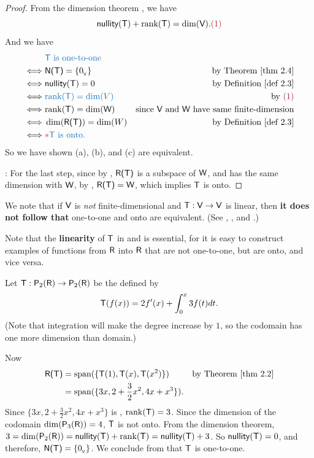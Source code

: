 \begin{proof}
From the dimension theorem , we have
\[
    \nullityT + \rankT = \dim(\V). \MAROON{(1)}
\]
And we have
\begin{align*}
         & \BLUE{\T \text{ is one-to-one }} \\
    \iff & \NULLT = \{ \OV \} & \text{by \THM{2.4}} \\
    \iff & \nullityT = 0 & \text{by \DEF{2.3}} \\
    \iff & \BLUE{\rankT = \dim(V)} & \text{by \MAROON{(1)}} \\
    \iff & \rankT = \dim(\W) & \text{since \(\V\) and \(\W\) have same finite-dimension} \\
    \iff & \dim(\RANGET) = \dim(W) & \text{by \DEF{2.3}} \\
    \iff & \RED{*} \BLUE{\T \text{ is onto.}}
\end{align*}
So we have shown (a), (b), and (c) are equivalent.

\RED{*}: For the last step, since by , \(\textsf{R(T)}\) is a subspace of \(\textsf{W}\), and has the same dimension with \(\textsf{W}\), by , \(\textsf{R(T)} = \textsf{W}\), which implies \(\textsf{T}\) is onto.
\end{proof}

\begin{remark} \label{remark 2.1.10}
We note that if \(\textsf{V}\) is \emph{not} finite-dimensional and \(\textsf{T} : \textsf{V} \to \textsf{V}\) is linear, then \textbf{it does not follow that} one-to-one and onto are equivalent.
(See , , and .)

Note that the \textbf{linearity} of \(\textsf{T}\) in  and  is essential, for it is easy to construct examples of functions from \(\textsf{R}\) into \(\textsf{R}\) that are not one-to-one, but
are onto, and vice versa.
\end{remark}

\begin{example} \label{example 2.1.11}
Let \(\textsf{T} : \textsf{P}_2(\textsf{R}) \to \textsf{P}_2(\textsf{R})\) be the \LTRAN{} defined by
\[
    \textsf{T}(f(x)) = 2f'(x) + \int_0^x 3f(t) dt.
\]
(Note that integration will make the degree increase by \(1\), so the codomain has one more dimension than domain.)

Now
\begin{align*}
    \RANGET & = \spann(\{ \T(1), \T(x), \T(x^2) \}) & \text{by \THM{2.2}} \\
            & = \spann(\{ 3x, 2 + \frac{3}{2} x^2, 4x + x^3 \}).
\end{align*}
Since \(\{ 3x, 2 + \frac{3}{2} x^2, 4x + x^3 \}\) is \LID{}, \(\mathrm{rank}(\textsf{T}) = 3\).
Since the dimension of the codomain \(\dim(\textsf{P}_3(\textsf{R})) = 4\), \(\textsf{T}\) is not onto.
From the dimension theorem, \(3 = \dim(\textsf{P}_2(\textsf{R})) = \textsf{nullity}(\textsf{T}) + \mathrm{rank}(\textsf{T}) = \textsf{nullity}(\textsf{T}) + 3\).
So \(\textsf{nullity}(\textsf{T}) = 0\), and therefore, \(\textsf{N(T)} = \{ 0_{_{\textsf{V}}} \}\).
We conclude from  that \(\textsf{T}\) is one-to-one.
\end{example}

